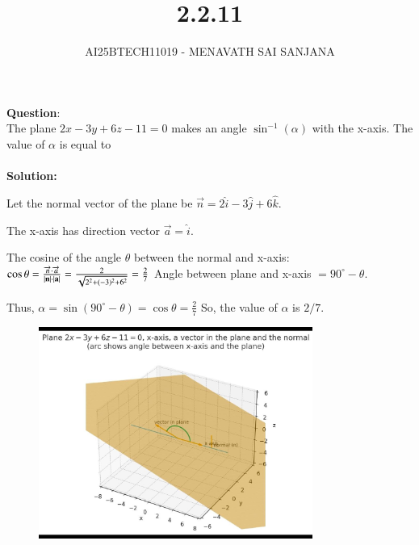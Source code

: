 \documentclass[journal]{IEEEtran}
\begin{document}

\vspace{3cm}

\title{2.2.11}
\author{AI25BTECH11019 - MENAVATH SAI SANJANA}
{\let\newpage\relax\maketitle}

\renewcommand{\thefigure}{\theenumi}
\renewcommand{\thetable}{\theenumi}
\setlength{\intextsep}{10pt} %


\renewcommand{\thetable}{\theenumi}

\textbf{Question}:\\
The plane $2x - 3y + 6z - 11 = 0$ makes an angle $\sin^{-1}(\alpha)$ with the x-axis. The value of $\alpha$ is equal to  \\
\\
\bigskip
\textbf{Solution: }

Let the normal vector of the plane be $\overrightarrow{n} = 2\hat{i} - 3\hat{j} + 6\hat{k}$.

The x-axis has direction vector $\overrightarrow{a} = \hat{i}$.

The cosine of the angle $\theta$ between the normal and x-axis:
$
\cos\theta = \frac{\overrightarrow{n} \cdot \overrightarrow{a}}{|\vec{n}| \cdot |\vec{a}|}
\\ = \frac{2}{\sqrt{2^2 + (-3)^2 + 6^2}} = \frac{2}{7}
$
\bigskip
Angle between plane and x-axis $= 90^\circ - \theta$.

Thus,
$
\alpha = \sin(90^\circ - \theta) = \cos\theta = \frac{2}{7}
$
So, the value of $\alpha$ is $2/7$.


\begin{figure}[ht!]
    \centering
    \includegraphics[width=0.8\textwidth]{figs/matgeo-2.2.11.jpeg}
    \caption{}
    \label{fig:1.2.27.jpg}
\end{figure}
\end{document}
